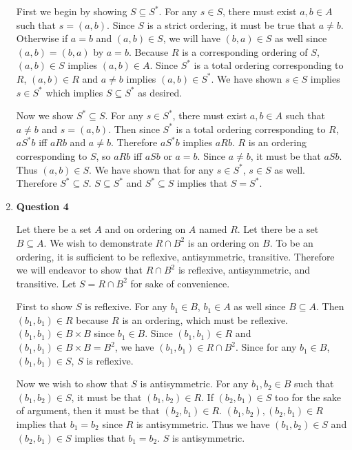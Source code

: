\documentclass{article}
\begin{document}
\begin{enumerate}
\medskip
First we begin by showing $S \subseteq S^{*}$. For any $s \in S$, there must exist $a,b \in A$ such that $s = (a,b)$. Since $S$ is a strict ordering, it must be true that $a \neq b$. Otherwise if $a = b$ and $(a,b) \in S$, we will have $(b,a) \in S$ as well since $(a,b) = (b,a)$ by $a = b$. Because $R$ is a corresponding ordering of $S$, $(a,b) \in S$ implies $(a,b) \in A$. Since $S^{*}$ is a total ordering corresponding to $R$, $(a,b) \in R$ and $a \neq b$ implies $(a,b) \in S^{*}$. We have shown $s \in S$ implies $s \in S^{*}$ which implies $S \subseteq S^{*}$ as desired.

\medskip
Now we show $S^{*} \subseteq S$. For any $s \in S^{*}$, there must exist $a,b \in A$ such that $a \neq b$ and $s = (a,b)$. Then since $S^{*}$ is a total ordering corresponding to $R$, $aS^{*}b$ iff $aRb$ and $a \neq b$. Therefore $aS^{*}b$ implies $aRb$. $R$ is an ordering corresponding to $S$, so $aRb$ iff $aSb$ or $a = b$. Since $a \neq b$, it must be that $aSb$. Thus $(a,b) \in S$. We have shown that for any $s \in S^{*}$, $s \in S$ as well. Therefore $S^{*} \subseteq S$. $S \subseteq S^{*}$ and $S^{*} \subseteq S$ implies that $S = S^{*}$.

\item \textbf{Question 4}
\medskip

Let there be a set $A$ and on ordering on $A$ named $R$. Let there be a set $B \subseteq A$. We wish to demonstrate $R \cap B^{2}$ is an ordering on $B$. To be an ordering, it is sufficient to be reflexive, antisymmetric, transitive. Therefore we will endeavor to show that $R \cap B^{2}$ is reflexive, antisymmetric, and transitive. Let $S = R \cap B^{2}$ for sake of convenience.

\medskip
First to show $S$ is reflexive. For any $b_1 \in B$, $b_1 \in A$ as well since $B \subseteq A$. Then $(b_1, b_1) \in R$ because $R$ is an ordering, which must be reflexive. $(b_1, b_1) \in B \times B$ since $b_1 \in B$. Since $(b_1, b_1) \in R$ and $(b_1, b_1) \in B \times B = B^{2}$, we have $(b_1, b_1) \in R \cap B^{2}$. Since for any $b_1 \in B$, $(b_1, b_1) \in S$, $S$ is reflexive.

\medskip
Now we wish to show that $S$ is antisymmetric. For any $b_1, b_2 \in B$ such that $(b_1, b_2) \in S$, it must be that $(b_1, b_2) \in R$. If $(b_2, b_1) \in S$ too for the sake of argument, then it must be that $(b_2, b_1) \in R$. $(b_1, b_2), (b_2, b_1) \in R$ implies that $b_1 = b_2$ since $R$ is antisymmetric. Thus we have $(b_1, b_2) \in S$ and $(b_2, b_1) \in S$ implies that $b_1 = b_2$. $S$ is antisymmetric. 


\end{enumerate}
\end{document}
